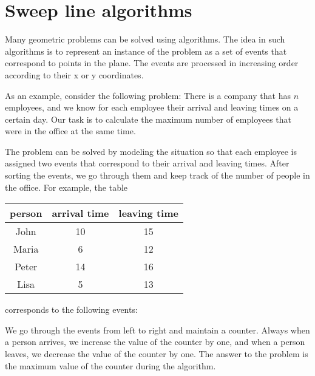 \chapter{Sweep line algorithms}


Many geometric problems can be solved using
 algorithms.
The idea in such algorithms is to represent
an instance of the problem as a set of events that correspond
to points in the plane.
The events are processed in increasing order
according to their x or y coordinates.

As an example, consider the following problem:
There is a company that has $n$ employees,
and we know for each employee their arrival and
leaving times on a certain day.
Our task is to calculate the maximum number of
employees that were in the office at the same time.

The problem can be solved by modeling the situation
so that each employee is assigned two events that
correspond to their arrival and leaving times.
After sorting the events, we go through them
and keep track of the number of people in the office.
For example, the table
\begin{center}
    \begin{tabular}{ccc}
        person & arrival time & leaving time \\
        \hline
        John   & 10           & 15           \\
        Maria  & 6            & 12           \\
        Peter  & 14           & 16           \\
        Lisa   & 5            & 13           \\
    \end{tabular}
\end{center}
corresponds to the following events:
\begin{center}
\end{center}
We go through the events from left to right
and maintain a counter.
Always when a person arrives, we increase
the value of the counter by one,
and when a person leaves,
we decrease the value of the counter by one.
The answer to the problem is the maximum
value of the counter during the algorithm.

